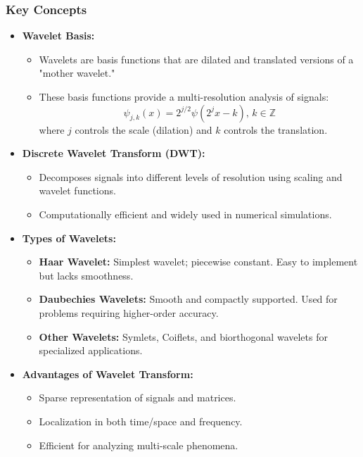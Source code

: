 \documentclass[12pt]{article}
\begin{document}
\subsubsection{Key Concepts}
\begin{itemize}
    \item \textbf{Wavelet Basis:}
          \begin{itemize}
              \item Wavelets are basis functions that are dilated and translated versions of a "mother wavelet."
              \item These basis functions provide a multi-resolution analysis of signals:
                    \[
                        \psi_{j,k}(x) = 2^{j/2} \psi(2^j x - k), \, k \in \mathbb{Z}
                    \]
                    where \(j\) controls the scale (dilation) and \(k\) controls the translation.
          \end{itemize}
    \item \textbf{Discrete Wavelet Transform (DWT):}
          \begin{itemize}
              \item Decomposes signals into different levels of resolution using scaling and wavelet functions.
              \item Computationally efficient and widely used in numerical simulations.
          \end{itemize}
    \item \textbf{Types of Wavelets:}
          \begin{itemize}
              \item \textbf{Haar Wavelet:} Simplest wavelet; piecewise constant. Easy to implement but lacks smoothness.
              \item \textbf{Daubechies Wavelets:} Smooth and compactly supported. Used for problems requiring higher-order accuracy.
              \item \textbf{Other Wavelets:} Symlets, Coiflets, and biorthogonal wavelets for specialized applications.
          \end{itemize}
    \item \textbf{Advantages of Wavelet Transform:}
          \begin{itemize}
              \item Sparse representation of signals and matrices.
              \item Localization in both time/space and frequency.
              \item Efficient for analyzing multi-scale phenomena.
          \end{itemize}
\end{itemize}
\end{document}
